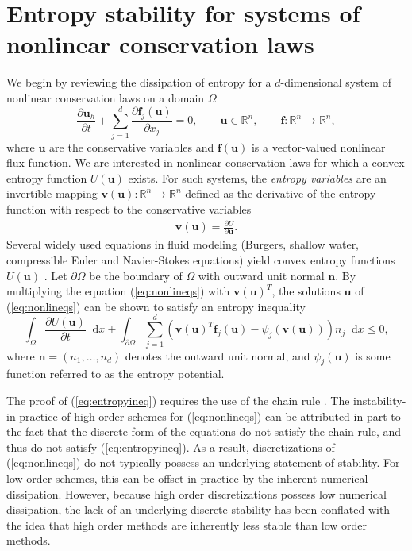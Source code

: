 \documentclass{svjour3}                     %
\newcommand*\diff[1]{\mathop{}\!{\mathrm{d}#1}}
\newcommand{\pd}[2]{\frac{\partial#1}{\partial#2}}
\newcommand{\LRp}[1]{\left( #1 \right)}
\begin{document}
\section{Entropy stability for systems of nonlinear conservation laws}
\label{sec:nonlin} 

We begin by reviewing the dissipation of entropy for a $d$-dimensional system of nonlinear conservation laws on a domain $\Omega$
\begin{equation}
\pd{\bm{u}_h}{t}  + \sum_{j=1}^d\pd{\bm{f}_j(\bm{u})}{x_j} = 0, \qquad \bm{u}\in \mathbb{R}^n, \qquad \bm{f}:\mathbb{R}^n\rightarrow\mathbb{R}^n,
\label{eq:nonlineqs}
\end{equation}
where $\bm{u}$ are the conservative variables and $\bm{f}(\bm{u})$ is a vector-valued nonlinear flux function.  We are interested in nonlinear conservation laws for which a convex entropy function $U(\bm{u})$ exists.  For such systems, the  \emph{entropy variables} are an invertible mapping $\bm{v}(\bm{u}):\mathbb{R}^n\rightarrow \mathbb{R}^n$ defined as the derivative of the entropy function with respect to the conservative variables 
\begin{align}
\bm{v}(\bm{u}) = \pd{U}{\bm{u}}.%
\label{eq:entropyvarsmap}
\end{align}
Several widely used equations in fluid modeling (Burgers, shallow water, compressible Euler and Navier-Stokes equations) yield convex entropy functions $U(\bm{u})$ \cite{hughes1986new, chen2017entropy}.  Let $\partial \Omega$ be the boundary of $\Omega$ with outward unit normal $\bm{n}$.  By multiplying the equation (\ref{eq:nonlineqs}) with $\bm{v}(\bm{u})^T$, the solutions $\bm{u}$ of (\ref{eq:nonlineqs}) can be shown to satisfy an entropy inequality
\begin{equation}
\int_{\Omega}\pd{U(\bm{u})}{t}\diff{x} + \int_{\partial \Omega} \sum_{j=1}^d \LRp{\bm{v}(\bm{u})^T\bm{f}_j(\bm{u}) - \psi_j\LRp{\bm{v}(\bm{u})}}n_j \diff{x} \leq 0, 
\label{eq:entropyineq}
\end{equation}
where $\bm{n} = \LRp{n_1,\ldots,n_d}$ denotes the outward unit normal, and $\psi_j(\bm{u})$ is some function referred to as the entropy potential.  

The proof of (\ref{eq:entropyineq}) requires the use of the chain rule \cite{mock1980systems, harten1983symmetric, dafermos2005compensated}.  The instability-in-practice of high order schemes for (\ref{eq:nonlineqs}) can be attributed in part to the fact that the discrete form of the equations do not satisfy the chain rule, and thus do not satisfy (\ref{eq:entropyineq}).  As a result, discretizations of (\ref{eq:nonlineqs}) do not typically possess an underlying statement of stability.  For low order schemes, this can be offset in practice by the inherent numerical dissipation.  However, because high order discretizations possess low numerical dissipation, the lack of an underlying discrete stability has been conflated with the idea that high order methods are inherently less stable than low order methods.
\end{document}
